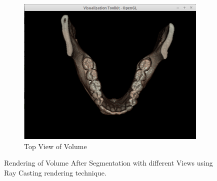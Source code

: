 \documentclass[10pt, b5paper]{article}
\begin{document}
\begin{figure}
\begin{subfigure}[b]{0.33\textwidth}
        \centering
        \includegraphics[width=\textwidth]{RCT}
        \caption{Top View of Volume}
    \end{subfigure}
    \caption{Rendering of Volume After Segmentation with different Views using  Ray Casting rendering technique.}
    \label{fig:RC}
\end{figure}
\end{document}
